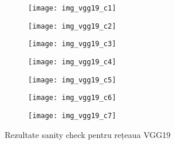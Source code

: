 \begin{figure}[!tbp]
  \centering
  \begin{subfigure}[b]{0.48\textwidth}
    \texttt{[image: img\_vgg19\_c1]}
  \end{subfigure}
  \hfill
  \begin{subfigure}[b]{0.48\textwidth}
    \texttt{[image: img\_vgg19\_c2]}
  \end{subfigure}
   \hfill
  \begin{subfigure}[b]{0.48\textwidth}
    \texttt{[image: img\_vgg19\_c3]}
  \end{subfigure}
  \hfill
  \begin{subfigure}[b]{0.48\textwidth}
    \texttt{[image: img\_vgg19\_c4]}
  \end{subfigure}
  \hfill
  \begin{subfigure}[b]{0.48\textwidth}
    \texttt{[image: img\_vgg19\_c5]}
  \end{subfigure}
  \hfill
  \begin{subfigure}[b]{0.48\textwidth}
    \texttt{[image: img\_vgg19\_c6]}
  \end{subfigure}
    \hfill
  \begin{subfigure}[b]{0.48\textwidth}
    \texttt{[image: img\_vgg19\_c7]}
  \end{subfigure}
  \caption[Rezultate sanity check pentru rețeaua VGG19]{Rezultate sanity check pentru rețeaua VGG19}
\end{figure}

